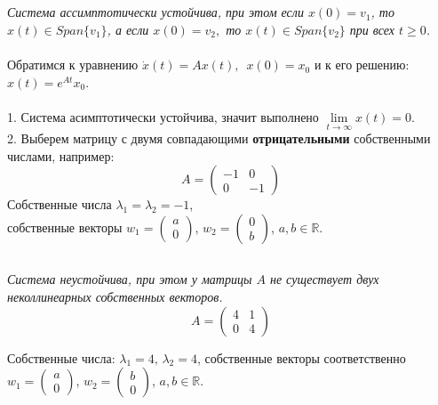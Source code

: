 \documentclass[a5paper, 10pt]{article}
\theoremstyle{definition}
\theoremstyle{plain}
\theoremstyle{remark}
\begin{document}
\subsection{}
\textit{Система ассимптотически устойчива, при этом если $x(0) = v_1$, то $x(t) \in Span\{v_1\}$, а если $x(0) = v_2,$ то  $x(t) \in Span\{v_2\}$ при всех $t \geq 0$.}\\
\\
Обратимся к уравнению $\dot{x}(t)=Ax(t), \, \, \, x(0) = x_0$ и к его решению:\\ $x(t) = e^{At}x_0$.\\
\\
1. Система асимптотически устойчива, значит выполнено $\lim \limits_{t \to \infty} x(t) = 0$.
\\
2. Выберем матрицу с двумя совпадающими \textbf{отрицательными} собственными числами, например:
\begin{equation}
A=
\begin{pmatrix}
-1 & 0\\
0 & -1
\end{pmatrix}
\end{equation}
Собственные числа $\lambda_1 = \lambda_2 = -1$,\\ собственные векторы $w_1 = \begin{pmatrix} a \\ 0 \end{pmatrix}$,  $w_2 = \begin{pmatrix} 0 \\ b \end{pmatrix}$, $a, b \in \mathbb{R}$.




\subsection{}
\textit{Система неустойчива, при этом у матрицы $A$ не существует двух неколлинеарных собственных векторов.}
\begin{equation}
A=
\begin{pmatrix}
4 & 1\\
0 & 4
\end{pmatrix}
\end{equation}

Собственные числа: $\lambda_1 = 4, \, \lambda_2 = 4$, собственные векторы соответственно $w_1 = \begin{pmatrix} a \\ 0 \end{pmatrix}$,  $w_2 = \begin{pmatrix} b \\ 0 \end{pmatrix}$, $a, b \in \mathbb{R}$.
\end{document}
